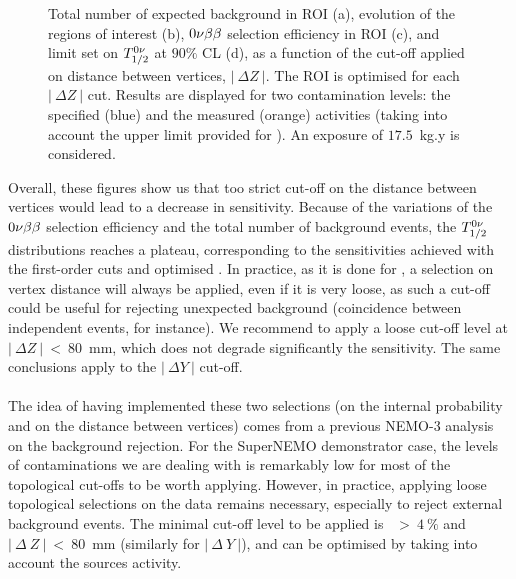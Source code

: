 \begin{figure}[!h]
\begin{subfigure}[t]{0.49\textwidth}
  \end{subfigure}
\caption{Total number of expected background in ROI (a),
  evolution of the regions of interest (b),
  $0\nu\beta\beta$ selection efficiency in ROI (c),
  and limit set on $T_{1/2}^{0\nu}$ at $90\%$ CL (d),
  as a function of the cut-off applied on distance between vertices, $|~\Delta Z~|$.
  The ROI is optimised for each $|~\Delta Z~|$ cut.
  Results are displayed for two contamination levels: the specified (blue) and the measured (orange) activities (taking into account the upper limit provided for \Bi).
  An exposure of $17.5$~kg.y is considered.
  \label{fig:cont_vertex}}
\end{figure}
Overall, these figures show us that too strict cut-off on the distance between vertices would lead to a decrease in sensitivity.
Because of the variations of the $0\nu\beta\beta$ selection efficiency and the total number of background events, the $T_{1/2}^{0\nu}$ distributions reaches a plateau, corresponding to the sensitivities achieved with the first-order cuts and optimised \Pint.
In practice, as it is done for \Pint, a selection on vertex distance will always be applied, even if it is very loose, as such a cut-off could be useful for rejecting unexpected background (coincidence between independent events, for instance).
We recommend to apply a loose cut-off level at $|~\Delta Z~|~<~80$~mm, which does not degrade significantly the sensitivity.
The same conclusions apply to the $|~\Delta Y~|$ cut-off.


\paragraph{}The idea of having implemented these two selections (on the internal probability and on the distance between vertices) comes from a previous NEMO-$3$ analysis on the background rejection.
For the SuperNEMO demonstrator case, the levels of contaminations we are dealing with is remarkably low for most of the topological cut-offs to be worth applying.
However, in practice, applying loose topological selections on the data remains necessary, especially to reject external background events.
The minimal cut-off level to be applied is \Pint~$>~4~\%$ and $|~\Delta~Z~|~<~80$~mm (similarly for $|~\Delta~Y~|$), and can be optimised by taking into account the sources activity.

